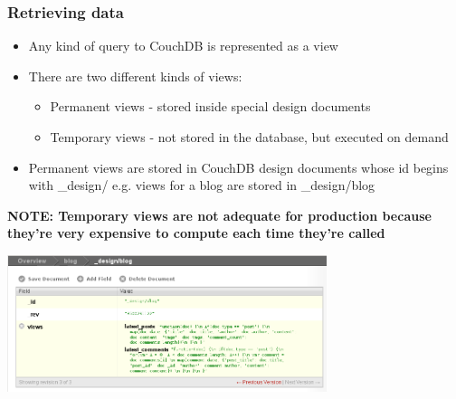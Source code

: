 \documentclass{beamer}
\begin{document}
\begin{frame}[t]
\frametitle{Retrieving data}
\begin{itemize}
\item Any kind of query to CouchDB is represented as a view
\item There are two different kinds of views:
\begin{itemize}
	\item Permanent views - stored inside special design documents
	\item Temporary views - not stored in the database, but executed on demand
\end{itemize}
\item Permanent views are stored in CouchDB design documents whose id begins with \_design/ e.g. views for a blog are stored in \_design/blog
\end{itemize}
{
\tiny \textbf{NOTE: Temporary views are not adequate for production because they're very expensive to compute each time they're called} 
}
\begin{center}
\includegraphics[height=4cm]{couchdb-view-big.png}
\end{center}
\end{frame}
\end{document}

